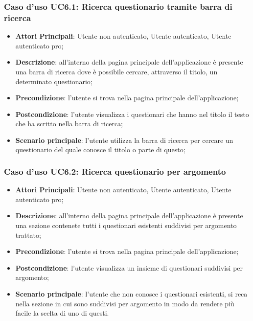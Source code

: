 \subsubsection{Caso d'uso UC6.1: Ricerca questionario tramite barra di ricerca}
\begin{itemize}
\item\textbf{Attori Principali}: Utente non autenticato, Utente autenticato, Utente autenticato pro;
\item\textbf{Descrizione}: all'interno della pagina principale dell'applicazione è presente una barra di ricerca dove è possibile cercare, attraverso il titolo, un determinato questionario;
\item\textbf{Precondizione}: l'utente si trova nella pagina principale dell'applicazione;
\item\textbf{Postcondizione}: l'utente visualizza i questionari che hanno nel titolo il testo che ha scritto nella barra di ricerca;
\item\textbf{Scenario principale}: l'utente utilizza la barra di ricerca per cercare un questionario del quale conosce il titolo o parte di questo;
\end{itemize}

\subsubsection{Caso d'uso UC6.2: Ricerca questionario per argomento}
\begin{itemize}
\item\textbf{Attori Principali}: Utente non autenticato, Utente autenticato, Utente autenticato pro;
\item\textbf{Descrizione}: all'interno della pagina principale dell'applicazione è presente una sezione contenete tutti i questionari esistenti suddivisi per argomento trattato;
\item\textbf{Precondizione}: l'utente si trova nella pagina principale dell'applicazione;
\item\textbf{Postcondizione}: l'utente visualizza un insieme di questionari suddivisi per argomento;
\item\textbf{Scenario principale}: l'utente che non conosce i questionari esistenti, si reca nella sezione in cui sono suddivisi per argomento in modo da rendere più facile la scelta di uno di questi. 
\end{itemize}

